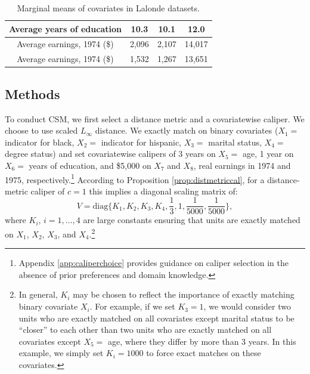 \documentclass{article}
\begin{document}
\begin{table}[t]
\begin{tabular}{c|ccc|}
\multicolumn{1}{|c|}{\cellcolor[HTML]{EFEFEF}Average years of education}  & \multicolumn{1}{c|}{10.3}                                                                             & \multicolumn{1}{c|}{10.1}                                                                             & 12.0   \\ \hline
\multicolumn{1}{|c|}{\cellcolor[HTML]{EFEFEF}Average earnings, 1974 (\$)} & \multicolumn{1}{c|}{2,096}                                                                            & \multicolumn{1}{c|}{2,107}                                                                            & 14,017 \\ \hline
\multicolumn{1}{|c|}{\cellcolor[HTML]{EFEFEF}Average earnings, 1974 (\$)} & \multicolumn{1}{c|}{1,532}                                                                            & \multicolumn{1}{c|}{1,267}                                                                            & 13,651 \\ \hline
\end{tabular}
\caption{Marginal means of covariates in Lalonde datasets.}
\label{tab:lalonde}
\end{table}

\subsection{Methods}

To conduct CSM, we first select a distance metric and a covariatewise caliper.
We choose to use scaled $L_\infty$ distance.
We exactly match on binary covariates ($X_1 =$ indicator for black, $X_2 =$ indicator for hispanic, $X_3 =$ marital status, $X_4 =$ degree status) and set covariatewise calipers of 3 years on $X_5 =$ age, 1 year on $X_6 =$ years of education, and \$5,000 on $X_7$ and $X_8$, real earnings in 1974 and 1975, respectively.\footnote{Appendix \ref{app:caliperchoice} provides guidance on caliper selection in the absence of prior preferences and domain knowledge.}
According to Proposition \ref{prop:distmetriccal}, for a distance-metric caliper of $c=1$ this implies a diagonal scaling matrix of:
$$V = \text{diag} \{K_1, K_2, K_3, K_4, \frac{1}{3}, 1, \frac{1}{5000}, \frac{1}{5000}\},$$
where $K_i$, $i=1,\dots,4$ are large constants ensuring that units are exactly matched on $X_1$, $X_2$, $X_3$, and $X_4$.\footnote{In general, $K_i$ may be chosen to reflect the importance of exactly matching binary covariate $X_i$.
For example, if we set $K_3 = 1$, we would consider two units who are exactly matched on all covariates except marital status to be ``closer'' to each other than two units who are exactly matched on all covariates except $X_5=$ age, where they differ by more than 3 years.
In this example, we simply set $K_i=1000$ to force exact matches on these covariates.}
\end{document}
